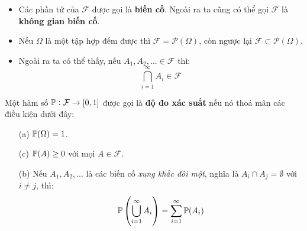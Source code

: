 \begin{itemize}
    \item Các phần tử của $\mathcal{F}$ được gọi là \textbf{biến cố}. Ngoài ra ta cũng có thể gọi $\mathcal{F}$ là \textbf{không gian biến cố}.

    \item Nếu $\Omega$ là một tập hợp đếm được thì $\mathcal{F} = \mathcal{P}(\Omega)$, còn ngược lại $\mathcal{F} \subset \mathcal{P}(\Omega)$.
    
    \item Ngoài ra ta có thể thấy, nếu $A_1, A_2, ... \in \mathcal{F}$ thì:
    $$
    \bigcap_{i=1}^{\infty} A_i \in \mathcal{F}
    $$
\end{itemize}

\begin{defivn}
    Một hàm số $\P: \mathcal{F} \to [0, 1]$ được gọi là \textbf{độ đo xác suất} nếu nó thoả mãn các điều kiện dưới đây:
    \begin{itemize}
        \item[(a)] $\P(\Omega) = 1$.
        \item[(c)] $\P(A) \geq 0$ với mọi $A \in \mathcal{F}$.
        \item[(b)] Nếu $A_1, A_2, ...$ là các biến cố \textit{xung khắc đôi một}, nghĩa là $A_i \cap A_j = \emptyset$ với $i \neq j$, thì:
        $$
        \P \left( \bigcup_{i=1}^{\infty} A_i \right) = \sum_{i=1}^{\infty} \P(A_i)
        $$
    \end{itemize}
\end{defivn}

